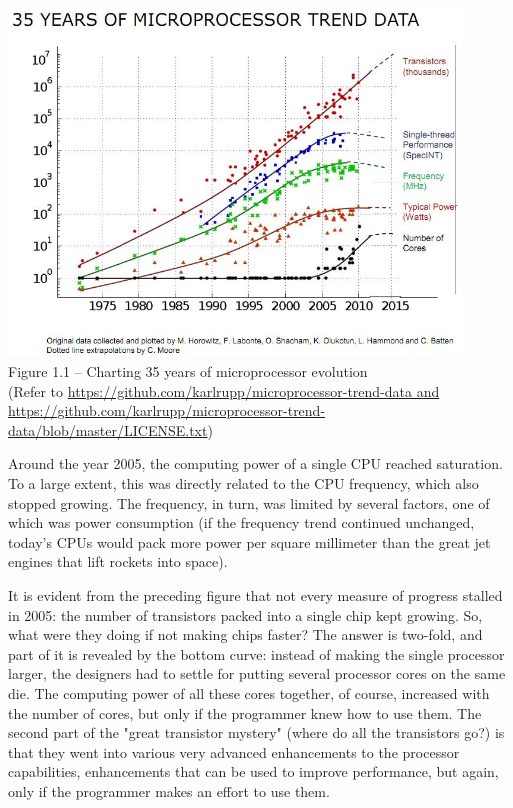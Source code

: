\hspace*{\fill} \\ %
\begin{center}
\includegraphics[width=0.9\textwidth]{content/1/chapter1/images/1.jpg}\\
Figure 1.1 – Charting 35 years of microprocessor evolution \\
(Refer to \url{https://github.com/karlrupp/microprocessor-trend-data and https://github.com/karlrupp/microprocessor-trend-data/blob/master/LICENSE.txt})
\end{center}

Around the year 2005, the computing power of a single CPU reached saturation. To a large extent, this was directly related to the CPU frequency, which also stopped growing. The frequency, in turn, was limited by several factors, one of which was power consumption (if the frequency trend continued unchanged, today's CPUs would pack more power per square millimeter than the great jet engines that lift rockets into space).

It is evident from the preceding figure that not every measure of progress stalled in 2005: the number of transistors packed into a single chip kept growing. So, what were they doing if not making chips faster? The answer is two-fold, and part of it is revealed by the bottom curve: instead of making the single processor larger, the designers had to settle for putting several processor cores on the same die. The computing power of all these cores together, of course, increased with the number of cores, but only if the programmer knew how to use them. The second part of the "great transistor mystery" (where do all the transistors go?) is that they went into various very advanced enhancements to the processor capabilities, enhancements that can be used to improve performance, but again, only if the programmer makes an effort to use them.


